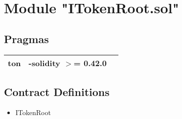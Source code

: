 
\section{Module "ITokenRoot.sol"}


\subsection{Pragmas}


\noindent\begin{tabular}{|l|l|p{5cm}|}\hline
ton & -solidity $>$= 0.42.0 &\\\hline
\end{tabular}


\subsection{Contract Definitions}

\begin{itemize}
\item ITokenRoot
\end{itemize}
